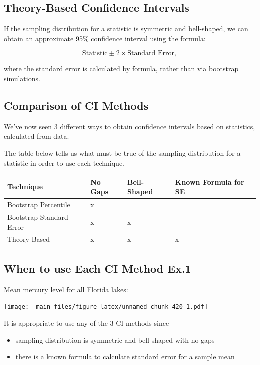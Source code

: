 \documentclass[]{book}
\providecommand{\tightlist}{%
  \setlength{\itemsep}{0pt}\setlength{\parskip}{0pt}}
\begin{document}
\subsection{Theory-Based Confidence
Intervals}\label{theory-based-confidence-intervals}

If the sampling distribution for a statistic is symmetric and
bell-shaped, we can obtain an approximate 95\% confidence interval using
the formula:

\[
\text{Statistic} \pm 2\times{\text{Standard Error}},
\]

where the standard error is calculated by formula, rather than via
bootstrap simulations.

\subsection{Comparison of CI Methods}\label{comparison-of-ci-methods}

We've now seen 3 different ways to obtain confidence intervals based on
statistics, calculated from data.

The table below tells us what must be true of the sampling distribution
for a statistic in order to use each technique.

\begin{longtable}[]{@{}llll@{}}
\toprule
Technique & No Gaps & Bell-Shaped & Known Formula for SE\tabularnewline
\midrule
\endhead
Bootstrap Percentile & x & &\tabularnewline
Bootstrap Standard Error & x & x &\tabularnewline
Theory-Based & x & x & x\tabularnewline
\bottomrule
\end{longtable}

\subsection{When to use Each CI Method
Ex.1}\label{when-to-use-each-ci-method-ex.1}

Mean mercury level for all Florida lakes:

\texttt{[image: \_main\_files/figure-latex/unnamed-chunk-420-1.pdf]}

It is appropriate to use any of the 3 CI methods since

\begin{itemize}
\tightlist
\item
  sampling distribution is symmetric and bell-shaped with no gaps\\
\item
  there is a known formula to calculate standard error for a sample mean
\end{itemize}
\end{document}
